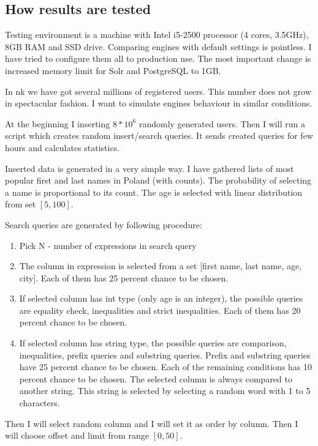 \documentclass[10pt,a4paper]{article}
\begin{document}
\subsection{How results are tested}

Testing environment is a machine with Intel i5-2500 processor (4 cores, 3.5GHz), 8GB RAM and SSD drive. Comparing engines with default settings is pointless. I have tried to configure them all to production use. The most important change is increased memory limit for Solr and PostgreSQL to 1GB.

In nk we have got several millions of registered users. This number does not grow in spectacular fashion. I want to simulate engines behaviour in similar conditions. 

At the beginning I inserting $8 * 10^6$ randomly generated users. Then I will run a script which creates random insert/search queries. It sends created queries for few hours and calculates statistics.

Inserted data is generated in a very simple way. I have gathered lists of most popular first and last names in Poland (with counts). The probability of selecting a name is proportional to its count. The age is selected with linear distribution from set $[5, 100]$. 

Search queries are generated by following procedure:
\begin{enumerate}
\item Pick N - number of expressions in search query
\item The column in expression is selected from a set [first name, last name, age, city]. Each of them has 25 percent chance to be chosen.
\item If selected column has int type (only age is an integer), the possible queries are equality check, inequalities and strict inequalities. Each of them has 20 percent chance to be chosen.
\item If selected column has string type, the possible queries are comparison, inequalities, prefix queries and substring queries. Prefix and substring queries have 25 percent chance to be chosen. Each of the remaining conditions has 10 percent chance to be chosen. The selected column is always compared to another string. This string is selected by selecting a random word with 1 to 5 characters.
\end{enumerate}

Then I will select random column and I will set it as order by column. Then I will choose offset and limit from range $[0, 50]$.
\end{document}
